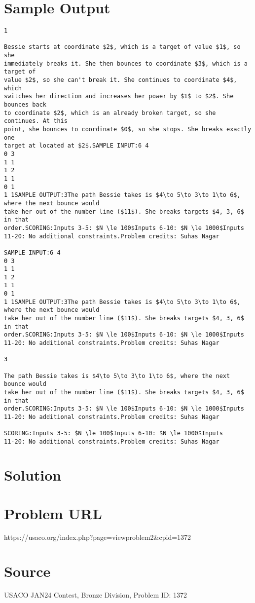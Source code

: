 \documentclass[12pt]{article}
\begin{document}
\section*{Sample Output}
\begin{verbatim}
1

Bessie starts at coordinate $2$, which is a target of value $1$, so she
immediately breaks it. She then bounces to coordinate $3$, which is a target of
value $2$, so she can't break it. She continues to coordinate $4$, which
switches her direction and increases her power by $1$ to $2$. She bounces back
to coordinate $2$, which is an already broken target, so she continues. At this
point, she bounces to coordinate $0$, so she stops. She breaks exactly one
target at located at $2$.SAMPLE INPUT:6 4
0 3
1 1
1 2
1 1
0 1
1 1SAMPLE OUTPUT:3The path Bessie takes is $4\to 5\to 3\to 1\to 6$, where the next bounce would
take her out of the number line ($11$). She breaks targets $4, 3, 6$ in that
order.SCORING:Inputs 3-5: $N \le 100$Inputs 6-10: $N \le 1000$Inputs
11-20: No additional constraints.Problem credits: Suhas Nagar

SAMPLE INPUT:6 4
0 3
1 1
1 2
1 1
0 1
1 1SAMPLE OUTPUT:3The path Bessie takes is $4\to 5\to 3\to 1\to 6$, where the next bounce would
take her out of the number line ($11$). She breaks targets $4, 3, 6$ in that
order.SCORING:Inputs 3-5: $N \le 100$Inputs 6-10: $N \le 1000$Inputs
11-20: No additional constraints.Problem credits: Suhas Nagar

3

The path Bessie takes is $4\to 5\to 3\to 1\to 6$, where the next bounce would
take her out of the number line ($11$). She breaks targets $4, 3, 6$ in that
order.SCORING:Inputs 3-5: $N \le 100$Inputs 6-10: $N \le 1000$Inputs
11-20: No additional constraints.Problem credits: Suhas Nagar

SCORING:Inputs 3-5: $N \le 100$Inputs 6-10: $N \le 1000$Inputs
11-20: No additional constraints.Problem credits: Suhas Nagar
\end{verbatim}

\section*{Solution}


\section*{Problem URL}
https://usaco.org/index.php?page=viewproblem2&cpid=1372

\section*{Source}
USACO JAN24 Contest, Bronze Division, Problem ID: 1372
\end{document}
